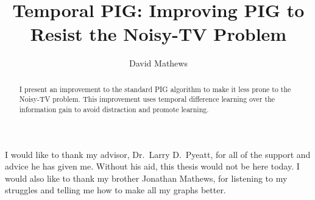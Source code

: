 \documentclass[12pt]{thesis}
\title{Temporal PIG: Improving PIG to Resist the Noisy-TV Problem}
\author{David Mathews}
\begin{document}
\maketitle

\makecopyright %

\preliminaries

\begin{abstract}
I present an improvement to the standard PIG algorithm to make it less prone to the Noisy-TV problem. This improvement uses temporal difference learning over the information gain to avoid distraction and promote learning.
\end{abstract}

\begin{acknowledgments}
  I would like to thank my advisor, Dr.\ Larry D.\ Pyeatt, for all of the support and advice he has given me. Without his aid, this thesis would not be here today. I would also like to thank my brother Jonathan Mathews, for listening to my struggles and telling me how to make all my graphs better.
\end{acknowledgments}


%
%




\end{document}
